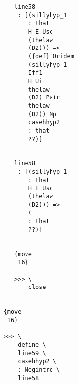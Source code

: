 \documentclass[12pt]{article}
\begin{document}
\begin{verbatim}
                                                   line58 
                                                    : [(sillyhyp_1 
                                                       : that 
                                                       H E Usc 
                                                       (thelaw 
                                                       (D2))) => 
                                                       ({def} Oridem 
                                                       (sillyhyp_1 
                                                       Iff1 
                                                       H Ui 
                                                       thelaw 
                                                       (D2) Pair 
                                                       thelaw 
                                                       (D2)) Mp 
                                                       casehhyp2 
                                                       : that 
                                                       ??)]


                                                   line58 
                                                    : [(sillyhyp_1 
                                                       : that 
                                                       H E Usc 
                                                       (thelaw 
                                                       (D2))) => 
                                                       (--- 
                                                       : that 
                                                       ??)]


                                                   {move 
                                                    16}

                                                   >>> \
                                                       close


                                                {move 
                                                 16}

                                                >>> \
                                                    define \
                                                    line59 \
                                                    casehhyp2 \
                                                    : Negintro \
                                                    line58



\end{verbatim}
\end{document}
